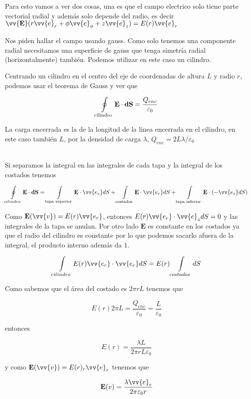\documentclass[leqno, 12pt, twoside, letterpaper]{book}
\def\efield{\textbf{E}}
\def\vdiff{\textbf{dS}}
\begin{document}
Para esto vamos a ver dos cosas, una es que el campo electrico solo tiene parte vectorial radial y además solo depende del radio, es decir $\vv{\efield}(r\vv{e}_r + \phi\vv{e}_{\phi} + z\vv{e}_z ) = E(r) \vv{e}_r$ 


Nos piden hallar el campo usando gauss. Como solo tenemos una componente radial necesitamos una superficie de gauss que tenga simetría radial (horizontalmente) también. Podemos utilizar en este caso un cilindro.

Centrando un cilindro en el centro del eje de coordenadas de altura $L$ y radio $r$, podemos usar el teorema de Gauss y ver que 

\[ \oint\displaylimits_{\textrm{cilindro}} \efield \cdot \vdiff = \dfrac{Q_{enc}}{\varepsilon_0}  \]

La carga encerrada es la de la longitud de la linea encerrada en el cilindro, en este caso también $L$, por la densidad de carga $\lambda$, $Q_{enc} = 2L\lambda/\varepsilon_0$

\hfill\\
\noindent Si separamos la integral en las integrales de cada tapa y la integral de los costados tenemos

\[ \oint\displaylimits_{cilindro} \efield \cdot \vdiff = \int\displaylimits_{\textrm{tapa superior}} \efield \cdot \vv{e_z}dS  + \int\displaylimits_{\textrm{costados}} \efield \cdot \vv{e_r}dS  + \int\displaylimits_{\textrm{tapa inferior}} \efield \cdot (-\vv{e_z}dS )\]

Como $\efield(\vv{v}) = E(r) \vv{e_r} $, entonces $E(r) \vv{e_r}  \cdot \vv{e}_z dS = 0$ y las integrales de la tapa se anulan. Por otro lado $\efield$ es constante en los costados ya que el radio del cilindro es constante por lo que podemos sacarlo afuera de la integral, el producto interno además da $1$.

\[ \int\displaylimits_{cilindro} E(r) \vv{e_r} \cdot \vv{e_r}dS =   E(r)  \int\displaylimits_{costados}dS \]

Como sabemos que el área del costado es $2\pi r L$ tenemos que

\[ E(r) 2\pi  L = \dfrac{Q_{enc}}{\varepsilon_0} = \dfrac{L}{\varepsilon_0} \]

entonces

\[ E(r) = \dfrac{\lambda L}{2\pi r L \varepsilon_0}\]

y como $\efield(\vv{v}) = E(r)_r \vv{e}_r$ tenemos que

\begin{exbox}

\[ \efield(v) = \dfrac{\lambda \vv{e}_r}{2\pi  \varepsilon_0r} \]

\end{exbox}
\end{document}
